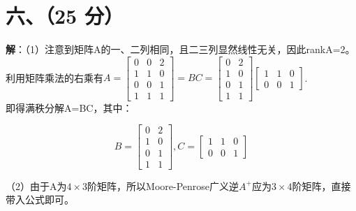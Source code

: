 \documentclass[11pt, a4paper]{article}
\begin{document}
\section*{六、（25 分）}
\textbf{解}：（1）注意到矩阵A的一、二列相同，且二三列显然线性无关，因此rankA=2。\\

利用矩阵乘法的右乘有$A = \begin{bmatrix} 0 & 0 & 2 \\ 1 & 1 & 0 \\ 0 & 0 & 1 \\ 1 & 1 & 1 \end{bmatrix}=BC= \begin{bmatrix}0 & 2 \\1 & 0 \\0 & 1 \\1 & 1 \end{bmatrix}\begin{bmatrix}1&1&0\\0&0&1\end{bmatrix}$.\\

即得满秩分解A=BC，其中：

$$B= \begin{bmatrix}0 & 2 \\1 & 0 \\0 & 1 \\1 & 1 \end{bmatrix},
C=\begin{bmatrix}1&1&0\\0&0&1\end{bmatrix}$$

（2）由于A为$4\times3$阶矩阵，所以Moore-Penrose广义逆$A^+$应为$3\times4$阶矩阵，直接带入公式即可。
\end{document}
